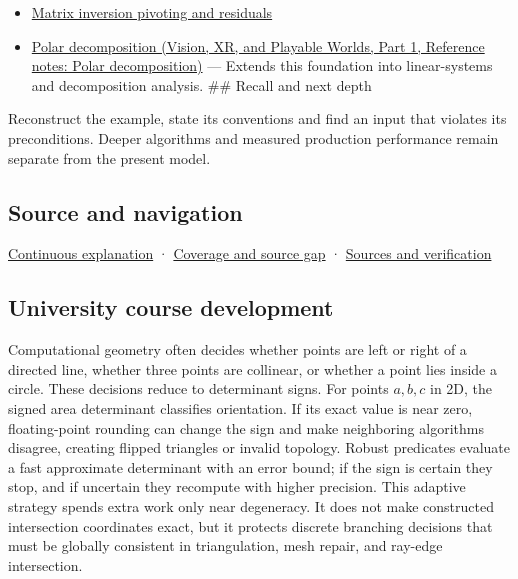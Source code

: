 \hypertarget{appendix-da478be01d02-used-by}{}

\begin{itemize}
\tightlist
\item
  \hyperref[appendix-48d2e66378ab]{Matrix inversion pivoting and residuals}
\item
  \href{../07-Vision-XR-and-Playable-Worlds-P01/main.pdf\#appendix-73f5bcf7a462}{Polar decomposition (Vision, XR, and Playable Worlds, Part 1, Reference notes: Polar decomposition)} --- Extends this foundation into linear-systems and decomposition analysis. \#\# Recall and next depth
\end{itemize}

Reconstruct the example, state its conventions and find an input that violates its preconditions. Deeper algorithms and measured production performance remain separate from the present model.

\subsection{Source and navigation}\label{appendix-da478be01d02-source-and-navigation}

\hypertarget{appendix-da478be01d02-source-and-navigation}{}

\hyperref[01-foundations-i-ch018-keep-the-promises-visible-while-moving-between-representations]{Continuous explanation} · \hyperref[appendix-fd090d982a15-phase-7---parts-601-700]{Coverage and source gap} · \hyperref[appendix-a103e7846d21-phase-7---source-analysis-and-verification]{Sources and verification}

\subsection{University course development}\label{appendix-da478be01d02-university-course-development}

\hypertarget{appendix-da478be01d02-university-course-development}{}

Computational geometry often decides whether points are left or right of a directed line, whether three points are collinear, or whether a point lies inside a circle. These decisions reduce to determinant signs. For points \(a,b,c\) in 2D, the signed area determinant classifies orientation. If its exact value is near zero, floating-point rounding can change the sign and make neighboring algorithms disagree, creating flipped triangles or invalid topology. Robust predicates evaluate a fast approximate determinant with an error bound; if the sign is certain they stop, and if uncertain they recompute with higher precision. This adaptive strategy spends extra work only near degeneracy. It does not make constructed intersection coordinates exact, but it protects discrete branching decisions that must be globally consistent in triangulation, mesh repair, and ray-edge intersection.

